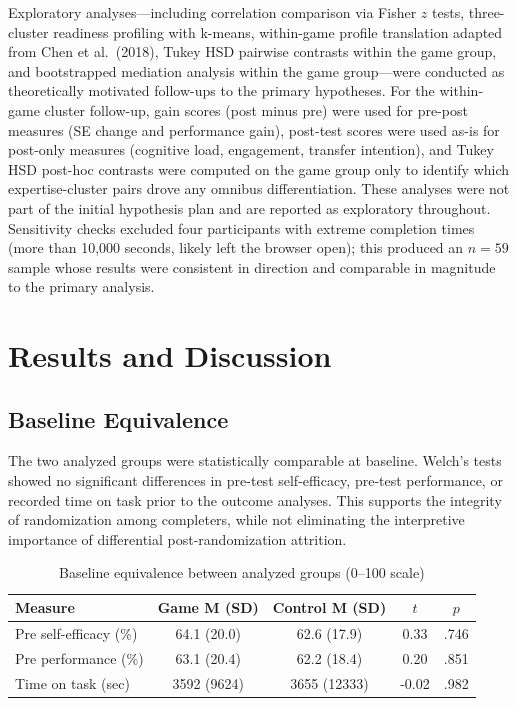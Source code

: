 \documentclass[12pt]{report}
\begin{document}
Exploratory analyses---including correlation comparison via Fisher $z$ tests, three-cluster readiness profiling with k-means, within-game profile translation adapted from Chen et al.\ (2018), Tukey HSD pairwise contrasts within the game group, and bootstrapped mediation analysis within the game group---were conducted as theoretically motivated follow-ups to the primary hypotheses. For the within-game cluster follow-up, gain scores (post minus pre) were used for pre-post measures (SE change and performance gain), post-test scores were used as-is for post-only measures (cognitive load, engagement, transfer intention), and Tukey HSD post-hoc contrasts were computed on the game group only to identify which expertise-cluster pairs drove any omnibus differentiation. These analyses were not part of the initial hypothesis plan and are reported as exploratory throughout. Sensitivity checks excluded four participants with extreme completion times (more than 10{,}000 seconds, likely left the browser open); this produced an $n = 59$ sample whose results were consistent in direction and comparable in magnitude to the primary analysis.

\chapter{Results and Discussion}

\section{Baseline Equivalence}
The two analyzed groups were statistically comparable at baseline. Welch's tests showed no significant differences in pre-test self-efficacy, pre-test performance, or recorded time on task prior to the outcome analyses. This supports the integrity of randomization among completers, while not eliminating the interpretive importance of differential post-randomization attrition.

\begin{table}[htbp]
\centering
\caption{Baseline equivalence between analyzed groups (0--100 scale)}
\begin{tabular}{p{5.2cm}cccc}
\toprule
\textbf{Measure} & \textbf{Game M (SD)} & \textbf{Control M (SD)} & \textbf{$t$} & \textbf{$p$} \\
\midrule
Pre self-efficacy (\%) & 64.1 (20.0) & 62.6 (17.9) & 0.33 & .746 \\
Pre performance (\%) & 63.1 (20.4) & 62.2 (18.4) & 0.20 & .851 \\
Time on task (sec) & 3592 (9624) & 3655 (12333) & -0.02 & .982 \\
\bottomrule
\end{tabular}
\end{table}
\end{document}
